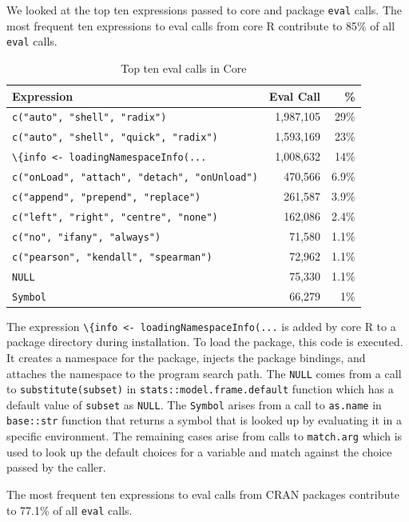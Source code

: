 \documentclass[USenglish,cleveref, autoref, thm-restate]{lipics-v2019}
\newcommand{\eval}{\texttt{eval}\xspace}
\renewcommand{\c}[1]{\lstinline{#1}\xspace}
\begin{document}
We looked at the top ten expressions passed to core and package \eval
calls. The most frequent ten expressions to eval calls from core R
contribute to 85\% of all \eval calls.

\begin{table}[!h] \centering
\begin{tabular}{@{}l|rr@{}} \hline
Expression & Eval Call &  \% \\\hline
\c{c("auto", "shell", "radix")} & 1,987,105 & 29\%\\
\c{c("auto", "shell", "quick", "radix")} & 1,593,169  & 23\%\\
\c{\{info <- loadingNamespaceInfo(...} & 1,008,632 &       14\%\\
\c{c("onLoad", "attach", "detach", "onUnload")}   & 470,566 &      6.9\%\\
\c{c("append", "prepend", "replace")} &              261,587&       3.9\% \\
\c{c("left", "right", "centre", "none")} & 162,086     & 2.4\%\\
\c{c("no", "ifany", "always")}   &                71,580 &       1.1\%\\
\c{c("pearson", "kendall", "spearman")}  & 72,962 &      1.1\%\\
\c{NULL}& 75,330  &      1.1\% \\
\c{Symbol}&                 66,279&       1\%\\\hline
\end{tabular}
\caption{Top ten eval calls in Core}\label{B}
\end{table}

The expression \c{\{info <- loadingNamespaceInfo(...} is added by core R
to a package directory during installation. To load the package, this code is
executed. It creates a namespace for the package, injects the package bindings,
and attaches the namespace to the program search path. The \c{NULL} comes from a
call to \c{substitute(subset)} in \c{stats::model.frame.default} function which
has a default value of \c{subset} as \c{NULL}. The \c{Symbol} arises from a
call to \c{as.name} in \c{base::str} function that returns a symbol that is
looked up by evaluating it in a specific environment. The remaining cases arise
from calls to \c{match.arg} which is used to look up the default choices for a
variable and match against the choice passed by the caller.

The most frequent ten expressions to eval calls from CRAN packages
contribute to 77.1\% of all \eval calls.
\end{document}
